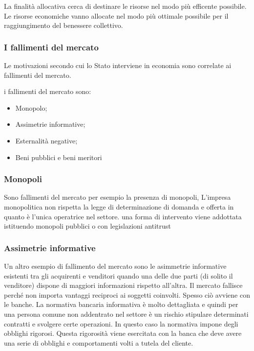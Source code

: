 \documentclass{report}
\begin{document}
La finalità allocativa cerca di destinare le risorse nel modo più efficente possibile.
Le risorse economiche vanno allocate nel modo più ottimale possibile per il raggiungimento del benessere collettivo.

\subsubsection{I fallimenti del mercato}

Le motivazioni secondo cui lo Stato interviene in economia sono correlate ai fallimenti del mercato.


i fallimenti del mercato sono:

\begin{itemize}
  \item Monopolo;
  \item Assimetrie informative;
  \item Esternalità negative;
  \item Beni pubblici e beni meritori
\end{itemize}

\subsubsection{Monopoli}

Sono fallimenti del mercato per esempio la presenza di monopoli, L'impresa monopolitica non rispetta la legge di determinazione di domanda e offerta in quanto è l'unica operatrice nel settore. una forma di intervento viene addottata istituendo monopoli pubblici o con legislazioni antitrust

\subsubsection{Assimetrie informative}

Un altro esempio di fallimento del mercato sono le asimmetrie informative esistenti tra gli acquirenti e venditori quando una delle due parti (di solito il venditore) dispone di maggiori informazioni rispetto all'altra. Il mercato fallisce perché non importa vantaggi reciproci ai soggetti coinvolti.
Spesso ciò avviene con le banche. 
 La normativa bancaria informativa è molto dettagliata e quindi per una persona comune non addentrato nel settore è un rischio stipulare determinati contratti e svolgere certe operazioni. In questo caso la normativa impone degli obblighi rigorosi. Questa rigorosità viene esercitata con la banca che deve avere una serie di obblighi e comportamenti volti a tutela del cliente.
\end{document}
